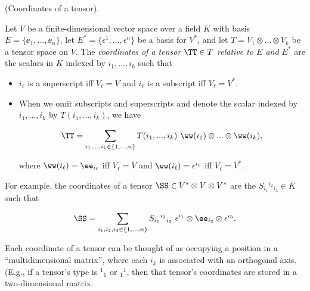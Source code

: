 \begin{defn}
\label{ch::motivated_intro::defn::pq_tensor_coords}
    (Coordinates of a tensor).

    Let $V$ be a finite-dimensional vector space over a field $K$ with basis $E = \{\ee_1, ..., \ee_n\}$, let $E^* = \{\epsilon^1, ..., \epsilon^n\}$ be a basis for $V^*$, and let $T = V_1 \otimes ... \otimes V_k$ be a tensor space on $V$. The \textit{coordinates of a tensor $\TT \in T$ relative to $E$ and $E^*$} are the scalars in $K$ indexed by $i_1, ..., i_k$ such that
    
    \begin{itemize}
        \item $i_\ell$ is a superscript iff $V_\ell = V$ and $i_\ell$ is a subscript iff $V_\ell = V^*$.
        \item When we omit subscripts and superscripts and denote the scalar indexed by $i_1, ..., i_k$ by $T(i_1, ..., i_k)$, we have 
        
        \begin{align*}
            \TT = \sum_{i_1, ..., i_k \in \{1, ..., n\}} T(i_1, ..., i_k) \spc \ww(i_1) \otimes ... \otimes \ww(i_k),
        \end{align*}
        
        where $\ww(i_\ell) = \ee_{i_\ell}$ iff $V_\ell = V$ and $\ww(i_\ell) = \epsilon^{i_\ell}$ iff $V_\ell = V^*$.
    \end{itemize}
    
    For example, the coordinates of a tensor $\SS \in V^* \otimes V \otimes V^*$ are the $S_{i_1}{}^{i_2}{}_{i_3} \in K$ such that
    
    \begin{align*}
        \SS = \sum_{i_1, i_2, i_3 \in \{1, ..., n\}} S_{i_1}{}^{i_2}{}_{i_3} \spc \epsilon^{i_1} \otimes \ee_{i_2} \otimes \epsilon^{i_3}.
    \end{align*}
    
    
    Each coordinate of a tensor can be thought of as occupying a position in a           ``multidimensional matrix'', where each $i_k$ is associated with an orthogonal axis. (E.g., if a tensor's type is $^1{}_1$ or $_1{}^1$, then that tensor's coordinates are stored in a two-dimensional matrix.
\end{defn}

